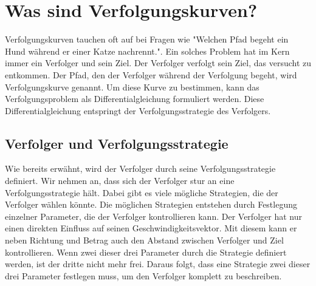 %
%
%
\section{Was sind Verfolgungskurven?
\label{lambertw:section:Was_sind_Verfolgungskurven}}

Verfolgungskurven tauchen oft auf bei Fragen wie "Welchen Pfad begeht ein Hund während er einer Katze nachrennt.".
Ein solches Problem hat im Kern immer ein Verfolger und sein Ziel.
Der Verfolger verfolgt sein Ziel, das versucht zu entkommen.
Der Pfad, den der Verfolger während der Verfolgung begeht, wird Verfolgungskurve genannt.
Um diese Kurve zu bestimmen, kann das Verfolgungsproblem als Differentialgleichung formuliert werden.
Diese Differentialgleichung entspringt der Verfolgungsstrategie des Verfolgers.


\subsection{Verfolger und Verfolgungsstrategie
\label{lambertw:subsection:Verfolger}}
Wie bereits erwähnt, wird der Verfolger durch seine Verfolgungsstrategie definiert.
Wir nehmen an, dass sich der Verfolger stur an eine Verfolgungsstrategie hält.
Dabei gibt es viele mögliche Strategien, die der Verfolger wählen könnte.
Die möglichen Strategien entstehen durch Festlegung einzelner Parameter, die der Verfolger kontrollieren kann.
Der Verfolger hat nur einen direkten Einfluss auf seinen Geschwindigkeitsvektor.
Mit diesem kann er neben Richtung und Betrag auch den Abstand zwischen Verfolger und Ziel kontrollieren.
Wenn zwei dieser drei Parameter durch die Strategie definiert werden, ist der dritte nicht mehr frei.
Daraus folgt, dass eine Strategie zwei dieser drei Parameter festlegen muss, um den Verfolger komplett zu beschreiben.

